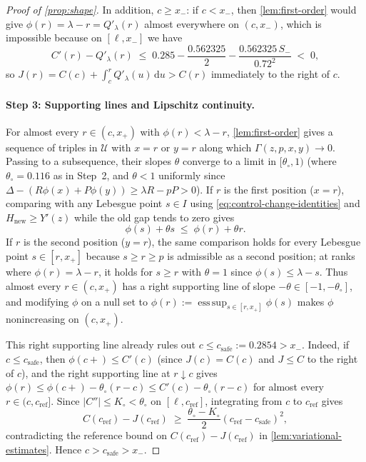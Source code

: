 \documentclass[11pt]{article}
\numberwithin{equation}{section}
\theoremstyle{plain}
\theoremstyle{definition}
\newcommand{\1}{\mathbf{1}}
\newcommand{\calU}{\mathcal{U}}
\begin{document}
\begin{proof}[Proof of {\cref{prop:shape}}]
In addition, $c \ge x_-$: if $c < x_-$, then \cref{lem:first-order} would give $\phi(r) = \lambda - r = Q'_\lambda(r)$ almost everywhere on $(c, x_-)$, which is impossible because on $[\ell, x_-]$ we have
\[
  C'(r) - Q'_\lambda(r) \;\le\; 0.285 - \frac{0.562325}{2} - \frac{0.562325\,S_-}{0.72^2} \;<\; 0,
\]
so $J(r) = C(c) + \int_c^r Q'_\lambda(u)\,\mathrm{d}u > C(r)$ immediately to the right of $c$.

\paragraph{Step 3: Supporting lines and Lipschitz continuity.}
For almost every $r \in (c, x_+)$ with $\phi(r) < \lambda - r$, \cref{lem:first-order} gives a sequence of triples in $\calU$ with $x = r$ or $y = r$ along which $\Gamma(z, p, x, y) \to 0$. Passing to a subsequence, their slopes $\theta$ converge to a limit in $[\theta_\circ, 1)$ (where $\theta_\circ = 0.116$ as in Step~2, and $\theta < 1$ uniformly since $\Delta - (R\phi(x) + P\phi(y)) \ge \lambda R - p P > 0$). If $r$ is the first position ($x = r$), comparing with any Lebesgue point $s \in I$ using \cref{eq:control-change-identities} and $H_{\mathrm{new}} \ge Y'(z)$ while the old gap tends to zero gives
\[
  \phi(s) + \theta s \;\le\; \phi(r) + \theta r.
\]
If $r$ is the second position ($y = r$), the same comparison holds for every Lebesgue point $s \in [r, x_+]$ because $s \ge r \ge p$ is admissible as a second position; at ranks where $\phi(r) = \lambda - r$, it holds for $s \ge r$ with $\theta = 1$ since $\phi(s) \le \lambda - s$. Thus almost every $r \in (c, x_+)$ has a right supporting line of slope $-\theta \in [-1, -\theta_\circ]$, and modifying $\phi$ on a null set to $\phi(r) := \operatorname{ess\,sup}_{s \in [r, x_+]} \phi(s)$ makes $\phi$ nonincreasing on $(c, x_+)$.

This right supporting line already rules out $c \le c_{\mathrm{safe}} := 0.2854 > x_-$. Indeed, if $c \le c_{\mathrm{safe}}$, then $\phi(c+) \le C'(c)$ (since $J(c) = C(c)$ and $J \le C$ to the right of $c$), and the right supporting line at $r \downarrow c$ gives $\phi(r) \le \phi(c+) - \theta_\circ(r - c) \le C'(c) - \theta_\circ(r - c)$ for almost every $r \in (c, c_{\mathrm{ref}}]$. Since $|C''| \le K_\circ < \theta_\circ$ on $[\ell, c_{\mathrm{ref}}]$, integrating from $c$ to $c_{\mathrm{ref}}$ gives
\[
  C(c_{\mathrm{ref}}) - J(c_{\mathrm{ref}}) \;\ge\; \frac{\theta_\circ - K_\circ}{2}(c_{\mathrm{ref}} - c_{\mathrm{safe}})^2,
\]
contradicting the reference bound on $C(c_{\mathrm{ref}}) - J(c_{\mathrm{ref}})$ in \cref{lem:variational-estimates}. Hence $c > c_{\mathrm{safe}} > x_-$.


\end{proof}
\end{document}
